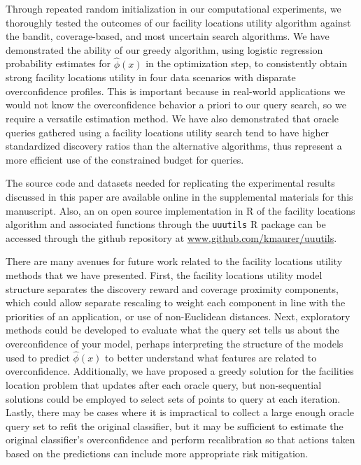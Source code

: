 \documentclass[letterpaper]{article} %
\newcommand{\km}[1]{{\color{red} #1}} %
\begin{document}
Through repeated random initialization in our computational experiments, we thoroughly tested the outcomes of our facility locations utility algorithm against the bandit, coverage-based, and most uncertain search algorithms. We have demonstrated the ability of our greedy algorithm, using logistic regression probability estimates for $\hat{\phi}(x)$ in the optimization step, to consistently obtain strong facility locations utility in four data scenarios with disparate overconfidence profiles. This is important because in real-world applications we would not know the overconfidence behavior a priori to our query search, so we require a versatile estimation method. We have also demonstrated that oracle queries gathered using a facility locations utility search tend to have higher standardized discovery ratios than the alternative algorithms, thus represent a more efficient use of the constrained budget for queries. 

The source code and datasets needed for replicating the experimental results discussed in this paper are available online in the supplemental materials for this manuscript. Also, an on open source  implementation in R \citep{R} of the facility locations algorithm and associated functions through the \km{\texttt{uuutils}} R package can be accessed through the github repository at \km{\url{www.github.com/kmaurer/uuutils}}.

There are many avenues for future work related to the facility locations utility methods that we have presented. First, the facility locations utility model structure separates the discovery reward and coverage proximity components, which could allow separate rescaling to weight each component in line with the priorities of an application, or use of non-Euclidean distances. Next, exploratory methods could be developed to evaluate what the query set tells us about the overconfidence of your model, perhaps interpreting the structure of the models used to predict $\hat{\phi}(x)$ to better understand what features are related to overconfidence. Additionally, we have proposed a greedy solution for the facilities location problem that updates after each oracle query, but non-sequential solutions could be employed to select sets of points to query at each iteration. Lastly, there may be cases where it is impractical to collect a large enough oracle query set to refit the original classifier, but it may be sufficient to estimate the original classifier’s overconfidence and perform recalibration so that actions taken based on the predictions can include more appropriate risk mitigation. 
\end{document}
